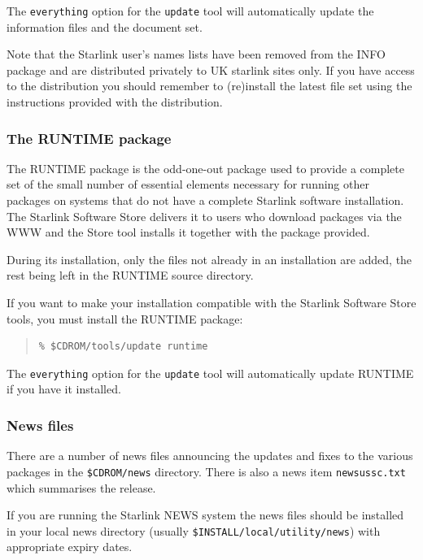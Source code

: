 \documentclass[twoside,11pt]{article}
\newcommand{\xlabel}[1]{}
\renewcommand{\_}{\texttt{\symbol{95}}}
\begin{document}
The \texttt{everything} option for the \texttt{update} tool will
automatically update the information files and the document set.

Note that the Starlink user's names lists have been removed from the INFO
package and are distributed privately to UK starlink sites only.  If you
have access to the distribution you should remember to (re)install the
latest file set using the instructions provided with the distribution. 

\subsubsection{\xlabel{the_runtime_set}The RUNTIME package}
\label{the_runtime_set}

The RUNTIME package is the odd-one-out package used to provide a complete set of
the small number of essential elements necessary for running other
packages on systems that do not have a complete Starlink software
installation.  The Starlink Software Store delivers it to users who
download packages via the WWW and the Store tool installs it together with
the package provided.

During its installation, only the files not already in an installation
are added, the rest being left in the RUNTIME source directory.

If you want to make your installation compatible with the Starlink Software
Store tools, you must install the RUNTIME package:

\begin{quote}
\begin{verbatim}
% $CDROM/tools/update runtime
\end{verbatim}
\end{quote}

The \texttt{everything} option for the \texttt{update} tool will
automatically update RUNTIME if you have it installed.

\subsubsection{News files}

There are a number of news files announcing the updates and fixes to
the various packages in the \texttt{\$CDROM/news} directory.  There is also
a news item \texttt{news\_ussc.txt} which summarises the release.

If you are running the Starlink NEWS system the news files should be
installed in your local news directory (usually 
\texttt{\$INSTALL/local/utility/news}) with appropriate expiry dates.
\end{document}
